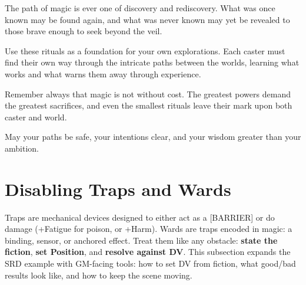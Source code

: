 The path of magic is ever one of discovery and rediscovery. What was once known may be found again, and what was never known may yet be revealed to those brave enough to seek beyond the veil.

Use these rituals as a foundation for your own explorations. Each caster must find their own way through the intricate paths between the worlds, learning what works and what warns them away through experience.

Remember always that magic is not without cost. The greatest powers demand the greatest sacrifices, and even the smallest rituals leave their mark upon both caster and world.

May your paths be safe, your intentions clear, and your wisdom greater than your ambition.

\chapter{Disabling Traps and Wards}\label{chapter:disabling-wards}

Traps are mechanical devices designed to either act as a [BARRIER] or do damage (+Fatigue for poison, or +Harm).
Wards are traps encoded in magic: a binding, sensor, or anchored effect. Treat them like any obstacle: \textbf{state the fiction}, \textbf{set Position}, and \textbf{resolve against DV}. This subsection expands the SRD example with GM-facing tools: how to set DV from fiction, what good/bad results look like, and how to keep the scene moving.

